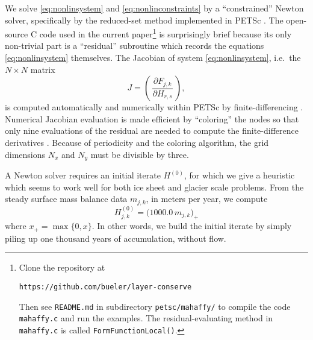 \documentclass[twocolumn,letterpaper]{igs}
\begin{document}
We solve \eqref{eq:nonlinsystem} and \eqref{eq:nonlinconstraints} by a ``constrained'' Newton solver, specifically by the reduced-set method \citep{BensonMunson2006} implemented in PETSc \citep{Balayetal2014}.  The open-source C code used in the current paper\footnote{Clone the repository at \begin{center}\texttt{https://github.com/bueler/layer-conserve}\end{center}  Then see \texttt{README.md} in subdirectory \texttt{petsc/mahaffy/} to compile the code \texttt{mahaffy.c} and run the examples.  The residual-evaluating method in \texttt{mahaffy.c} is called \texttt{FormFunctionLocal()}.} is surprisingly brief because its only non-trivial part is a ``residual'' subroutine which records the equations \eqref{eq:nonlinsystem} themselves.  The Jacobian of system \eqref{eq:nonlinsystem}, i.e.~the $N\times N$ matrix
\begin{equation}
J = \left(\,\frac{\partial F_{j,k}}{\partial H_{r,s}}\,\right),
\end{equation}
is computed automatically and numerically within PETSc by finite-differencing \citep{Kelley2003}.  Numerical Jacobian evaluation is made efficient by ``coloring'' the nodes so that only nine evaluations of the residual are needed to compute the finite-difference derivatives \citep{CurtisPowellReid1974}.  Because of periodicity and the coloring algorithm, the grid dimensions $N_x$ and $N_y$ must be divisible by three.

A Newton solver requires an initial iterate $H^{(0)}$, for which we give a heuristic which seems to work well for both ice sheet and glacier scale problems.  From the steady surface mass balance data $m_{j,k}$, in meters per year, we compute
\begin{equation}
H_{j,k}^{(0)} = \big(1000.0\,m_{j,k}\big)_+  \label{eq:nonlininitialheuristic}
\end{equation}
where $x_+ = \max\{0,x\}$.  In other words, we build the initial iterate by simply piling up one thousand years of accumulation, without flow.
\end{document}
